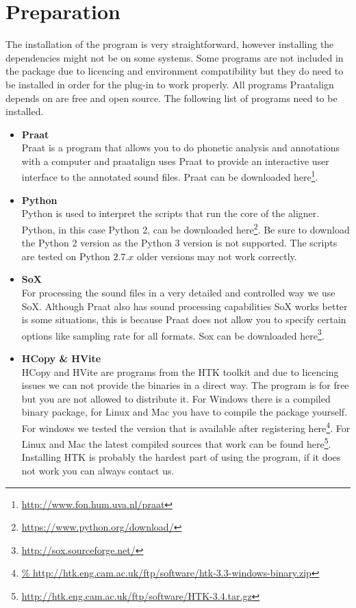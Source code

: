\section{Preparation}
The installation of the program is very straightforward, however installing the
dependencies might not be on some systems.
Some programs are not included in the package due to licencing and environment
compatibility but they do need to be installed in order for the plug-in to work
properly. All programs Praatalign depends on are free and open source. The
following list of programs need to be installed.
\begin{itemize}
	\item \textbf{Praat}\\
		Praat is a program that allows you to do phonetic analysis and annotations
		with a computer and praatalign uses Praat to provide an interactive user
		interface to the annotated sound files. Praat can be downloaded
		here\footnote{\url{http://www.fon.hum.uva.nl/praat}}.
	\item \textbf{Python}\\
		Python is used to interpret the scripts that run the core of the aligner.
		Python, in this case Python 2, can be downloaded
		here\footnote{\url{https://www.python.org/download/}}. Be sure to download
		the Python 2 version as the Python 3 version is not supported. The scripts
		are tested on Python $2.7.x$ older versions may not work correctly.
	\item \textbf{SoX}\\
		For processing the sound files in a very detailed and controlled way we
		use SoX. Although Praat also has sound processing capabilities SoX works
		better is some situations, this is because Praat does not allow you to
		specify certain options like sampling rate for all formats. Sox can be
		downloaded here\footnote{\url{http://sox.sourceforge.net/}}.
	\item \textbf{HCopy \& HVite}\\
		HCopy and HVite are programs from the HTK toolkit and due to licencing
		issues we can not provide the binaries in a direct way. The program is for
		free but you are not allowed to distribute it. For Windows there is a
		compiled binary package, for Linux and Mac you have to compile the package
		yourself. For windows we tested the version that is available after
		registering here\footnote{\url{%
http://htk.eng.cam.ac.uk/ftp/software/htk-3.3-windows-binary.zip}}.
		For Linux and Mac the latest compiled sources that work can be found
		here\footnote{\url{http://htk.eng.cam.ac.uk/ftp/software/HTK-3.4.tar.gz}}.
		Installing HTK is probably the hardest part of using the program, if it
		does not work you can always contact us.
\end{itemize}

